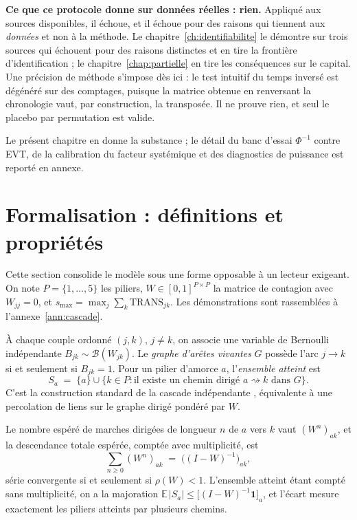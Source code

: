 \begin{attention}
\textbf{Ce que ce protocole donne sur données réelles : rien.} Appliqué aux sources
disponibles, il échoue, et il échoue pour des raisons qui tiennent aux \emph{données} et non à
la méthode. Le chapitre~\ref{ch:identifiabilite} le démontre sur trois sources qui échouent pour
des raisons distinctes et en tire la frontière d'identification ; le
chapitre~\ref{chap:partielle} en tire les conséquences sur le capital. Une précision de méthode
s'impose dès ici : le test intuitif du \og temps inversé \fg{} est dégénéré
sur des comptages, puisque la matrice obtenue en renversant la chronologie vaut, par
construction, la transposée. Il ne prouve rien, et seul le placebo par permutation est valide.
\end{attention}

Le présent chapitre en donne la substance ; le détail du banc d'essai
$\Phi^{-1}$ contre EVT, de la calibration du facteur systémique et des diagnostics de
puissance est reporté en annexe.


\section{Formalisation : définitions et propriétés}
\label{sec:formalisation}

Cette section consolide le modèle sous une forme opposable à un lecteur exigeant. On note
$P=\{1,\dots,5\}$ les piliers, $W\in[0,1]^{P\times P}$ la matrice de contagion avec
$W_{jj}=0$, et $s_{\max}=\max_j\sum_k \mathrm{TRANS}_{jk}$. Les démonstrations sont
rassemblées à l'annexe~\ref{ann:cascade}.

\begin{definition}
\label{def:cascade}
À chaque couple ordonné $(j,k)$, $j\neq k$, on associe une variable de Bernoulli
indépendante $B_{jk}\sim\mathcal B(W_{jk})$. Le \emph{graphe d'arêtes vivantes} $G$ possède
l'arc $j\to k$ si et seulement si $B_{jk}=1$. Pour un pilier d'amorce $a$, l'\emph{ensemble
atteint} est
\[
  S_a \;=\; \{a\}\cup\{k\in P : \text{il existe un chemin dirigé } a\rightsquigarrow k \text{ dans } G\}.
\]
C'est la construction standard de la cascade indépendante \citep{kempe2003}, équivalente à une percolation
de liens sur le graphe dirigé pondéré par $W$.
\end{definition}

\begin{proposition}
\label{prop:reduite}
Le nombre espéré de marches dirigées de longueur $n$ de $a$ vers $k$ vaut $(W^n)_{ak}$, et la
descendance totale espérée, comptée avec multiplicité, est
\[
  \sum_{n\ge 0}(W^n)_{ak} \;=\; \bigl((I-W)^{-1}\bigr)_{ak},
\]
série convergente si et seulement si $\rho(W)<1$. L'ensemble atteint étant compté sans
multiplicité, on a la majoration $\mathbb E\,|S_a|\le \bigl[(I-W)^{-1}\mathbf 1\bigr]_a$, et
l'écart mesure exactement les piliers atteints par plusieurs chemins.
\end{proposition}

